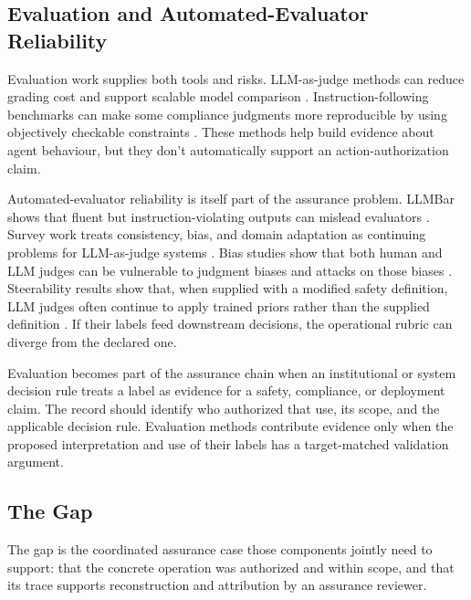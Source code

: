 \subsection{Evaluation and Automated-Evaluator Reliability}

Evaluation work supplies both tools and risks. LLM-as-judge methods can reduce grading cost and support scalable model comparison \parencite{zheng2023judging,liu2023geval}. Instruction-following benchmarks can make some compliance judgments more reproducible by using objectively checkable constraints \parencite{zhou2023ifeval}. These methods help build evidence about agent behaviour, but they don't automatically support an action-authorization claim.

Automated-evaluator reliability is itself part of the assurance problem. LLMBar shows that fluent but instruction-violating outputs can mislead evaluators \parencite{zeng2024llmbar}. Survey work treats consistency, bias, and domain adaptation as continuing problems for LLM-as-judge systems \parencite{gu2025judgeSurvey}. Bias studies show that both human and LLM judges can be vulnerable to judgment biases and attacks on those biases \parencite{chen2024judgementBias}. Steerability results show that, when supplied with a modified safety definition, LLM judges often continue to apply trained priors rather than the supplied definition \parencite{alloula2026safetyContextual}. If their labels feed downstream decisions, the operational rubric can diverge from the declared one.

Evaluation becomes part of the assurance chain when an institutional or system decision rule treats a label as evidence for a safety, compliance, or deployment claim. The record should identify who authorized that use, its scope, and the applicable decision rule. Evaluation methods contribute evidence only when the proposed interpretation and use of their labels has a target-matched validation argument.

\subsection{The Gap}

The gap is the coordinated assurance case those components jointly need to support: that the concrete operation was authorized and within scope, and that its trace supports reconstruction and attribution by an assurance reviewer.
